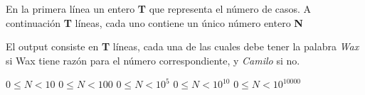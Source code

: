 \documentclass{oci}
\begin{document}
\begin{inputDescription}
En la primera línea un entero \textbf{T} que representa el número de casos.
A continuación \textbf{T} líneas, cada uno contiene un único número entero \textbf{N}
\end{inputDescription}

\begin{outputDescription}
El output consiste en \textbf{T} líneas, cada una de las cuales debe tener la palabra \textit{Wax} si Wax tiene razón para el número correspondiente, y \textit{Camilo} si no.
\end{outputDescription}

\begin{scoreDescription}
   $ 0 \le N < 10$
   $ 0 \le N < 100$
   $ 0 \le N < 10^5$
   $ 0 \le N < 10^{10}$
   $ 0 \le N < 10^{10000}$
\end{scoreDescription}

\begin{sampleDescription}
\end{sampleDescription}
\end{document}

